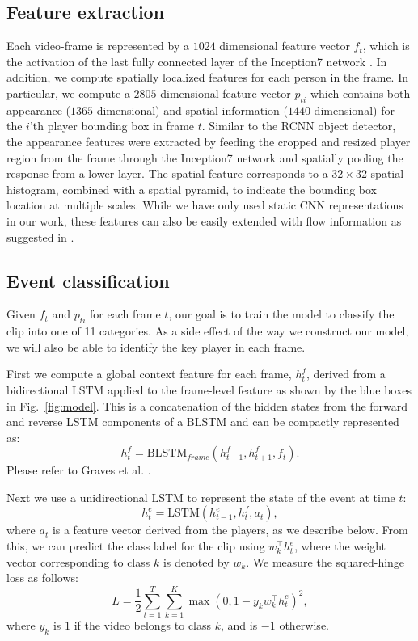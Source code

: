 \subsection{Feature extraction}
\label{sec:feature_extraction}
Each video-frame is represented by a $1024$ dimensional feature vector $f_t$, which is the
activation of the last fully connected layer of the Inception7 network
\cite{Ioffe_arxiv15,Inception7}.  In addition, we compute spatially localized
features for each person in the frame. In particular, we compute a $2805$ dimensional feature
vector $p_{ti}$ which contains both appearance ($1365$ dimensional) and spatial information ($1440$ dimensional) for the
$i$'th player bounding box in frame $t$.
Similar to the RCNN object
detector\cite{Girshick_CVPR14}, the appearance features were extracted by feeding the cropped
and resized player region from the frame through the Inception7 network and
spatially pooling the response from a lower layer. The spatial feature
corresponds to a $32\times 32$ spatial histogram, combined with a spatial pyramid, to
indicate the bounding box location at multiple scales.
While we have only used static CNN representations in our
work, these features can also be easily extended with flow information as
suggested in \cite{Simonyan_NIPS14}.

\subsection{Event classification}

Given $f_t$ and $p_{ti}$ for each frame $t$, our goal
is to train the model to classify the clip into one of 11 categories. As a side
effect of the way we construct our model, we will also be able to identify the
key player in each frame.

First we compute a global context feature for each frame, $h_t^f$, derived from
a bidirectional LSTM applied to the frame-level feature as shown 
by the blue boxes in Fig.~\ref{fig:model}.
This is a concatenation of the hidden states from the forward and reverse LSTM
components of a BLSTM and can be compactly represented as:
\begin{equation}
  h_t^f = \mbox{BLSTM}_{frame}(h_{t-1}^f, h_{t+1}^f, f_t).
\end{equation}Please refer to Graves et al. \cite{Graves_2013}.

Next we use  a unidirectional LSTM to represent the state of the
event at time $t$:
\begin{equation}
  \label{eq:event_lstm}
h_t^e = \mbox{LSTM}(h_{t-1}^e, h_t^f, a_t),
\end{equation}
where $a_t$ is a feature vector derived from the players, as we
describe below.
From this, we can predict the class label for the clip using 
$w_k^\intercal h_t^e$,
where the weight vector corresponding to
class $k$ is denoted by $w_k$.
 We measure the squared-hinge loss as follows:
\begin{equation}
  L =   \frac{1}{2} \sum_{t=1}^T \sum_{k = 1}^K \max (0, 1 - y_k w_k^\intercal h^e_t)^2,
\end{equation} 
where $y_k$ is $1$ if the video belongs to class $k$,
and is $-1$ otherwise.

